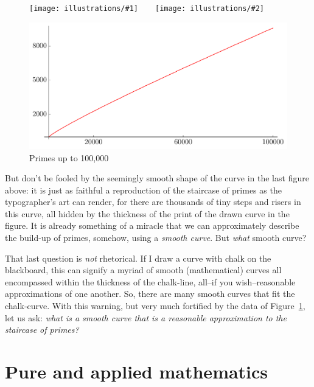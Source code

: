 \documentclass[11pt,draft]{article}
\newcommand{\illtwo}[4]{ 
   \begin{figure}[H]
   \begin{center}
   \texttt{[image: illustrations/\#1]}$\qquad$\texttt{[image: illustrations/\#2]}
   \caption{#4}
    \end{center}
    \end{figure}
}
\theoremstyle{plain}
\theoremstyle{definition}
\numberwithin{equation}{section}
\numberwithin{figure}{section}
\numberwithin{table}{section}
\begin{document}
\illtwo{PN_1000}{PN_10000}{.33}{}

   \begin{figure}[H]
   \begin{center}
   \includegraphics[width=.7\textwidth]{illustrations/PN_100000}
   \caption{Primes up to 100,000\label{fig:pn100000}}
   \end{center}
    \end{figure}

But don't be fooled by the seemingly smooth shape of the curve in the
last figure above: it is just as faithful a reproduction of the
staircase of primes as the typographer's art can render, for there are
thousands of tiny steps and risers in this curve, all hidden by the
thickness of the print of the drawn curve in the figure.  It is
already something of a miracle that we can approximately describe the
build-up of primes, somehow, using a {\em smooth curve}.  But {\em
  what} smooth curve?


That last question is {\em not} rhetorical. If I draw a curve with
chalk on the blackboard, this can signify a myriad of smooth
(mathematical) curves all encompassed within the thickness of the
chalk-line, all--if you wish--reasonable approximations of one
another. So, there are many smooth curves that fit the chalk-curve.
With this warning, but very much fortified by the data of Figure~\ref{fig:pn100000},
let us ask: {\em what is a smooth curve that is a reasonable
  approximation to the staircase of primes?}

\section{ Pure and applied  mathematics  }     
\end{document}

